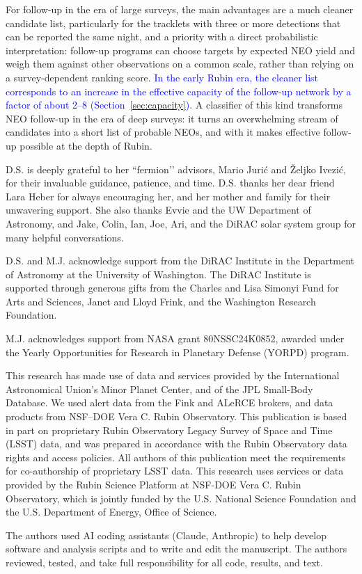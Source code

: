 \documentclass[linenumbers,twocolumn]{aastex701}
\newcommand{\coauthor}[1]{\textcolor{blue}{#1}}
\begin{document}
For follow-up in the era of large surveys, the main advantages are a much
cleaner candidate list, particularly for the tracklets with three or more
detections that can be reported the same night, and a priority with a
direct probabilistic interpretation: follow-up programs can choose targets
by expected NEO yield and weigh them against other observations on a common
scale, rather than relying on a survey-dependent ranking score.
\coauthor{In the early Rubin era, the cleaner list corresponds to an increase
in the effective capacity of the follow-up network by a factor of about
2--8 (Section~\ref{sec:capacity}).} A classifier
of this kind transforms NEO follow-up in the era of deep surveys: it turns
an overwhelming stream of candidates into a short list of probable NEOs,
and with it makes effective follow-up possible at the depth of Rubin.


\begin{acknowledgments}
D.S. is deeply grateful to her ``fermion’’ advisors, Mario Juri\'{c} and \v{Z}eljko Ivezi\'{c}, for their invaluable guidance, patience, and time. D.S. thanks her dear friend Lara Heber for always encouraging her, and her mother and family for their unwavering support. She also thanks Evvie and the UW Department of Astronomy, and Jake, Colin, Ian, Joe, Ari, and the DiRAC solar system group for many helpful conversations.

D.S. and M.J. acknowledge support from the DiRAC Institute in the Department of Astronomy at the University of Washington. The DiRAC Institute is supported through generous gifts from the Charles and Lisa Simonyi Fund for Arts and Sciences, Janet and Lloyd Frink, and the Washington Research Foundation.

M.J. acknowledges support from NASA grant 80NSSC24K0852, awarded under the Yearly Opportunities for Research in Planetary Defense (YORPD) program.

This research has made use of data and services provided by the International Astronomical Union’s Minor Planet Center, and of the JPL Small-Body Database. We used alert data from the Fink and ALeRCE brokers, and data products from NSF–DOE Vera C. Rubin Observatory.
This publication is based in part on proprietary Rubin Observatory Legacy Survey of Space and Time (LSST) data, and was prepared in accordance with the Rubin Observatory data rights and access policies. All authors of this publication meet the requirements for co-authorship of proprietary LSST data. This research uses services or data provided by the Rubin Science Platform at NSF-DOE Vera C. Rubin Observatory, which is jointly funded by the U.S. National Science Foundation and the U.S. Department of Energy, Office of Science.

The authors used AI coding assistants
(Claude, Anthropic) to help develop software and analysis scripts and to write
and edit the manuscript. The authors reviewed, tested, and take full responsibility for
all code, results, and text.

\end{acknowledgments}
\end{document}
